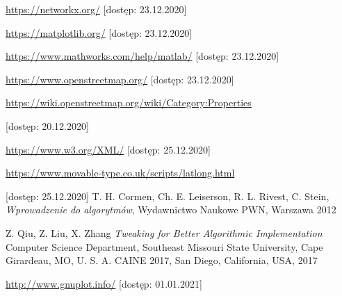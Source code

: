 \documentclass[a4paper, 12pt, twoside, openright]{article}
\begin{document}
\begin{thebibliography}{99}
	 \href{https://networkx.org/}{https://networkx.org/} [dostęp: 23.12.2020]
	
	 \href{https://matplotlib.org/}{https://matplotlib.org/} [dostęp: 23.12.2020]

	 \href{https://www.mathworks.com/help/matlab/}{https://www.mathworks.com/help/matlab/} [dostęp: 23.12.2020]
	
	 \href{https://www.openstreetmap.org/}{https://www.openstreetmap.org/} [dostęp: 23.12.2020]
	
	
	 \href{https://wiki.openstreetmap.org/wiki/Category:Properties}{https://wiki.openstreetmap.org/wiki/Category:Properties}
	
		
	[dostęp: 20.12.2020]

	\href{https://www.w3.org/XML/}{https://www.w3.org/XML/} 	[dostęp: 25.12.2020]
	
	\href{https://www.movable-type.co.uk/scripts/latlong.html }{https://www.movable-type.co.uk/scripts/latlong.html }
	
	
	[dostęp: 25.12.2020]
	T. H. Cormen, Ch. E. Leiserson, R. L. Rivest, C. Stein, \textit{Wprowadzenie do algorytmów}, Wydawnictwo Naukowe PWN, Warszawa 2012
	
	Z. Qiu, Z. Liu, X. Zhang \textit{Tweaking for Better Algorithmic Implementation}	Computer Science Department, Southeast Missouri State University, Cape Girardeau, MO, U. S. A. CAINE 2017, San Diego, California, USA, 2017
	
	\href{http://www.gnuplot.info/}{http://www.gnuplot.info/}	[dostęp: 01.01.2021]
\end{thebibliography}	
\end{document}
